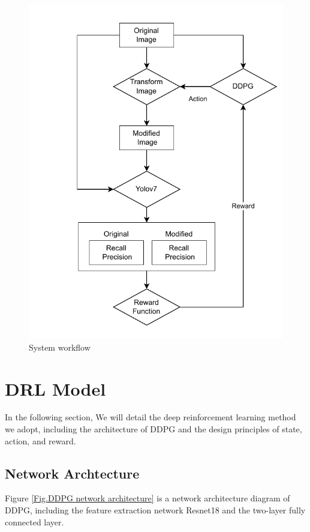 \documentclass[PhD]{PHlab-thesis}
\begin{document}
\begin{figure}[htb] 
\centering 
\includegraphics[width=\textwidth,height=\textheight,keepaspectratio]{images/system workflow.pdf}
\caption{System workflow} 
\label{Fig.System workflow} 
\end{figure}

\section{DRL Model}
In the following section, We will detail the deep reinforcement learning method we adopt, including the architecture of DDPG and the design principles of state, action, and reward.

\subsection{Network Archtecture}
Figure \ref{Fig.DDPG network architecture} is a network architecture diagram of DDPG, including the feature extraction network Resnet18 and the two-layer fully connected layer.
\end{document}
